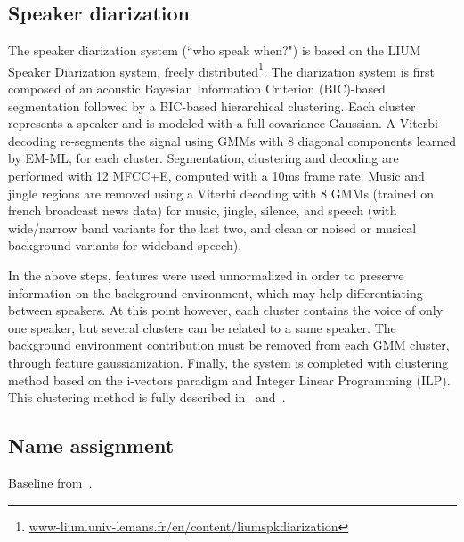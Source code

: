 \subsection{Speaker diarization}

The speaker diarization system (``who speak when?") is based on the LIUM Speaker Diarization system\cite{rouvier2013}, freely distributed\footnote{\url{www-lium.univ-lemans.fr/en/content/liumspkdiarization}}. 
%
The diarization system is first composed of an acoustic Bayesian Information Criterion (BIC)-based segmentation followed by a BIC-based hierarchical clustering. Each cluster represents a speaker and is modeled with a full covariance Gaussian. A Viterbi decoding re-segments the signal using GMMs with 8 diagonal components learned by EM-ML, for each cluster. Segmentation, clustering and decoding are performed with 12 MFCC+E, computed with a 10ms frame rate. Music and jingle regions are removed using a Viterbi decoding with 8 GMMs (trained on french broadcast news data) for music, jingle, silence, and speech (with wide/narrow band variants for the last two, and clean or noised or musical background variants for wideband speech).

In the above steps, features were used unnormalized in order to preserve information on the background environment, which may help differentiating between speakers. At this point however, each cluster contains the voice of only one speaker, but several clusters can be related to a same speaker. The background environment contribution must be removed from each GMM cluster, through feature gaussianization.
%
Finally, the system is completed with clustering method based on the i-vectors paradigm and Integer Linear Programming (ILP). 
This clustering method is fully described in~\cite{rouvier12-2} and~\cite{dupuy2014}. 

\subsection{Name assignment}

Baseline from~\cite{poignant2012fusion}.

\endinput

